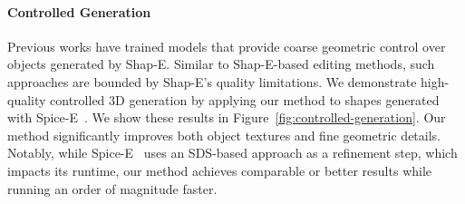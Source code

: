 \paragraph{Controlled Generation}
Previous works have trained models that provide coarse geometric control over objects generated by Shap-E. Similar to Shap-E-based editing methods, such approaches are bounded by Shap-E's quality limitations. We demonstrate high-quality controlled 3D generation by applying our method to shapes generated with Spice-E~\cite{sella2024spicee}.
We show these results in Figure~\ref{fig:controlled-generation}. Our method significantly improves both object textures and fine geometric details. Notably, while Spice-E~\cite{sella2024spicee} uses an SDS-based approach as a refinement step, which impacts its runtime, our method achieves comparable or better results while running an order of magnitude faster.

% 


\vspace{-3pt}
